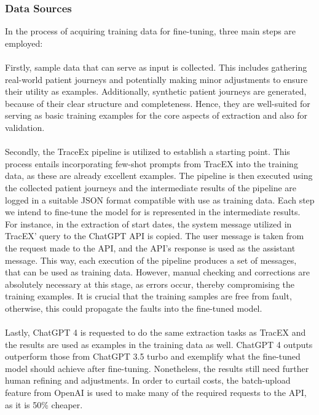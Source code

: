 \subsubsection{Data Sources}
In the process of acquiring training data for fine-tuning, three main steps are employed:\\\\
Firstly, sample data that can serve as input is collected. This includes gathering real-world patient journeys and potentially making minor adjustments to ensure their utility as examples. Additionally, synthetic patient journeys are generated, because of their clear structure and completeness. Hence, they are well-suited for serving as basic training examples for the core aspects of extraction and also for validation.\\\\
Secondly, the TraceEx pipeline is utilized to establish a starting point. This process entails incorporating few-shot prompts from TracEX into the training data, as these are already excellent examples. The pipeline is then executed using the collected patient journeys and the intermediate results of the pipeline are logged in a suitable JSON format compatible with use as training data. Each step we intend to fine-tune the model for is represented in the intermediate results. For instance, in the extraction of start dates, the system message utilized in TracEX' query to the ChatGPT API is copied. The user message is taken from the request made to the API, and the API's response is used as the assistant message. This way, each execution of the pipeline produces a set of messages, that can be used as training data. However, manual checking and corrections are absolutely necessary at this stage, as errors occur, thereby compromising the training examples. It is crucial that the training samples are free from fault, otherwise, this could propagate the faults into the fine-tuned model.\\\\
Lastly, ChatGPT 4 is requested to do the same extraction tasks as TracEX and the results are used as examples in the training data as well. ChatGPT 4 outputs outperform those from ChatGPT 3.5 turbo and exemplify what the fine-tuned model should achieve after fine-tuning. Nonetheless, the results still need further human refining and adjustments. In order to curtail costs, the batch-upload feature from OpenAI is used to make many of the required requests to the API, as it is 50\% cheaper.

